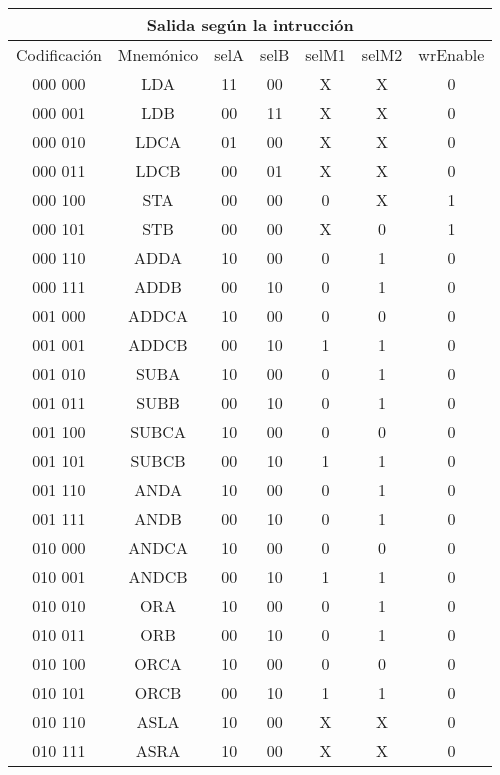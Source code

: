 \documentclass[paper=letter, fontsize=12pt]{article}
\begin{document}
\begin{table}[h]
\centering
\begin{tabular}{cc|ccccc}
\multicolumn{7}{c}{Salida según la intrucción} \\ \hline
Codificación& Mnemónico	  	& selA & selB & selM1 & selM2 & wrEnable \\ \hline
000 000 	& LDA 		  	& 11 	& 00    & X     & X     & 0 \\
000 001		& LDB  			& 00 	& 11    & X     & X     & 0 \\           
000 010 	& LDCA 			& 01 	& 00    & X     & X     & 0 \\            
000 011 	& LDCB 			& 00 	& 01    & X     & X     & 0 \\           
000 100 	& STA  	 		& 00 	& 00    & 0     & X     & 1 \\            
000 101 	& STB  			& 00 	& 00    & X     & 0     & 1 \\            
000 110 	& ADDA			& 10 	& 00    & 0     & 1     & 0 \\
000 111 	& ADDB			& 00 	& 10    & 0     & 1     & 0 \\
001 000 	& ADDCA			& 10 	& 00    & 0     & 0     & 0 \\
001 001 	& ADDCB			& 00 	& 10    & 1     & 1     & 0 \\
001 010 	& SUBA			& 10 	& 00    & 0     & 1     & 0 \\
001 011 	& SUBB			& 00 	& 10    & 0     & 1     & 0 \\
001 100 	& SUBCA			& 10 	& 00    & 0     & 0     & 0 \\
001 101 	& SUBCB			& 00 	& 10    & 1     & 1     & 0 \\
001 110 	& ANDA			& 10 	& 00    & 0     & 1     & 0 \\
001 111 	& ANDB			& 00 	& 10    & 0    	& 1     & 0 \\
010 000 	& ANDCA			& 10 	& 00    & 0     & 0     & 0 \\
010 001 	& ANDCB			& 00 	& 10    & 1     & 1     & 0 \\
010 010 	& ORA			& 10 	& 00    & 0     & 1     & 0 \\
010 011 	& ORB			& 00 	& 10    & 0     & 1     & 0 \\
010 100 	& ORCA			& 10 	& 00    & 0     & 0     & 0 \\
010 101 	& ORCB			& 00 	& 10    & 1     & 1     & 0 \\
010 110 	& ASLA			& 10 	& 00    & X     & X     & 0 \\
010 111 	& ASRA			& 10 	& 00    & X     & X     & 0 \\
	

\end{tabular}
\end{table}
\end{document}

